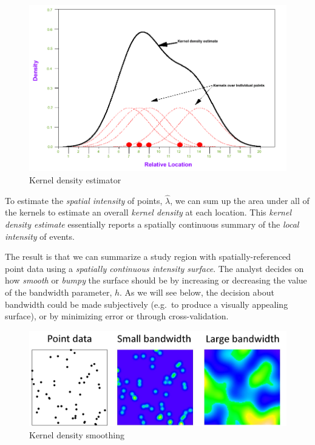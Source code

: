 \documentclass[
]{book}
\begin{document}
\begin{figure}
\centering
\includegraphics{images/kde2.png}
\caption{\label{fig:unnamed-chunk-4}Kernel density estimator}
\end{figure}

To estimate the \emph{spatial intensity} of points, \(\hat{\lambda}\), we can sum up the area under all of the kernels to estimate an overall \emph{kernel density} at each location. This \emph{kernel density estimate} essentially reports a spatially continuous summary of the \emph{local intensity} of events.

The result is that we can summarize a study region with spatially-referenced point data using a \emph{spatially continuous intensity surface}. The analyst decides on how \emph{smooth} or \emph{bumpy} the surface should be by increasing or decreasing the value of the bandwidth parameter, \(h\). As we will see below, the decision about bandwidth could be made subjectively (e.g.~to produce a visually appealing surface), or by minimizing error or through cross-validation.

\begin{figure}
\centering
\includegraphics{images/kde3.jpg}
\caption{\label{fig:unnamed-chunk-5}Kernel density smoothing}
\end{figure}
\end{document}
